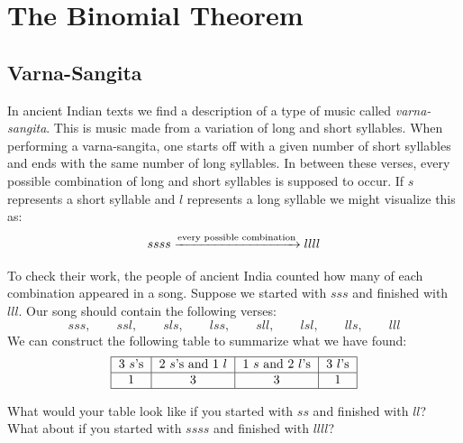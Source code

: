 \newpage



\section{The Binomial Theorem}


\subsection{Varna-Sangita}

In ancient Indian texts we find a description of a type of music
called \textit{varna-sangita}. This is music made
from a variation of long and short syllables. When performing a
varna-sangita, one starts off with a given number of short syllables
and ends with the same number of long syllables. In between these
verses, every possible combination of long and short syllables is
supposed to occur. If $s$ represents a short syllable and $l$
represents a long syllable we might visualize this as:
\[
ssss  \xrightarrow{\text{every possible combination}} llll
\]

To check their work, the people of ancient India counted how many of
each combination appeared in a song. Suppose we started with $sss$ and
finished with $lll$. Our song should contain the following verses:
\[
sss,\qquad ssl,\qquad sls, \qquad lss, \qquad sll,\qquad lsl, \qquad lls,\qquad lll
\]
We can construct the following table to summarize what we have found:
\[
\begin{tabular}{|c|c|c|c|}\hline
$3$ $s$'s & $2$ $s$'s and $1$ $l$ & $1$ $s$ and $2$ $l$'s & $3$ $l$'s \\ \hline
1 & 3 & 3 & 1\\\hline
\end{tabular}
\]

\begin{question} 
What would your table look like if you started with $ss$ and finished
with $ll$? What about if you started with $ssss$ and finished with
$llll$?
\end{question}
\QM

